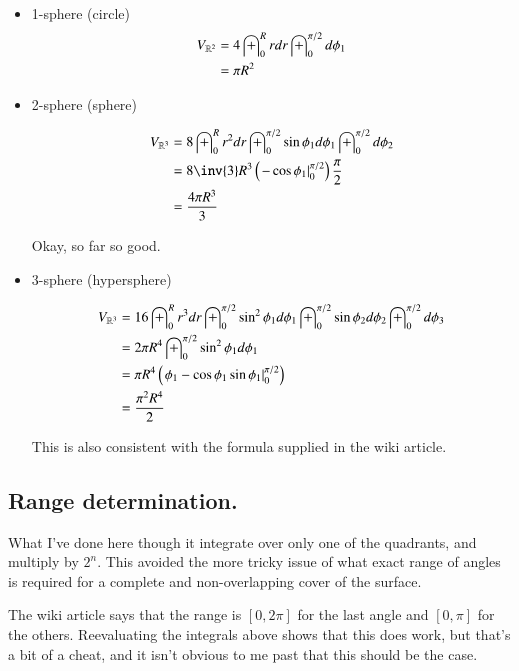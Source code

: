 \documentclass{article}
\begin{document}
\begin{itemize}
\item 1-sphere (circle)
\begin{align*}
V_{\mathbb{R}^{2}} 
&= 4 \int_{0}^R r dr \int_{0}^{\pi/2} d\phi_1 \\
&= \pi R^2 
\end{align*}

\item 2-sphere (sphere)

\begin{align*}
V_{\Rm{3}} 
&= 8 \int_0^R r^2 dr \int_0^{\pi/2} \sin\phi_1 d\phi_1 \int_0^{\pi/2} d\phi_2 \\
&= 8 \inv{3} R^3 \left( {\left. -\cos\phi_1 \right\vert}_0^{\pi/2} \right) \frac{\pi}{2} \\
&= \frac{4\pi R^3}{3} \\
\end{align*}

Okay, so far so good.

\item 3-sphere (hypersphere)

\begin{align*}
V_{\mathbb{R}^{3}} 
&= 16 \int_0^R r^3 dr \int_0^{\pi/2} \sin^2\phi_1 d\phi_1 \int_0^{\pi/2} \sin\phi_2 d\phi_2 \int_0^{\pi/2} d\phi_3 \\
&= 2 \pi R^4 \int_0^{\pi/2} \sin^2\phi_1 d\phi_1 \\
&= \pi R^4 \left( {\left.  \phi_1 - \cos\phi_1 \sin\phi_1 \right\vert}_0^{\pi/2} \right) \\
&= \frac{\pi^2 R^4}{2} \\
\end{align*}

This is also consistent with the formula supplied in the wiki article.  

\end{itemize}

\subsection{ Range determination. }

What I've done here though it integrate over only one of the quadrants, and multiply by $2^n$.  This avoided the more tricky issue of what exact range of angles is required for a complete and non-overlapping cover of the surface.

The wiki article says that the range is $[0,2\pi]$ for the last angle and $[0,\pi]$ for the others.  
Reevaluating the integrals above shows that this does work, but that's a bit of a cheat, and it isn't obvious
to me past  that this should be the case.
\end{document}
